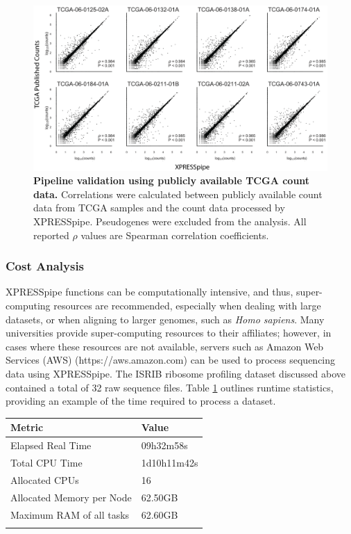 \documentclass[10pt, oneside]{article}
\begin{document}
\begin{figure}
\centering
  \includegraphics[width=180mm]{figures/xpresspipe_figure4.png}
  \caption{\textbf{Pipeline validation using publicly available TCGA count data.} Correlations were calculated between publicly available count data from TCGA samples and the count data processed by XPRESSpipe. Pseudogenes were excluded from the analysis. All reported $\rho$ values are Spearman correlation coefficients.}
  \label{fig:figure4}
\end{figure}


\subsubsection{Cost Analysis}
XPRESSpipe functions can be computationally intensive, and thus, super-computing resources are recommended, especially when dealing with large datasets, or when aligning to larger genomes, such as \textit{Homo sapiens}. Many universities provide super-computing resources to their affiliates; however, in cases where these resources are not available, servers such as Amazon Web Services (AWS) (https://aws.amazon.com) can be used to process sequencing data using XPRESSpipe. The ISRIB ribosome profiling dataset discussed above contained a total of 32 raw sequence files. Table \ref{tab:chpc_performance} outlines runtime statistics, providing an example of the time required to process a dataset. \par

\begin{table}[!]
    \centering
{}
\begin{tabular}{p{5cm}p{3cm}}
\textbf{Metric} & \textbf{Value} \\
\hline
 Elapsed Real Time & 09h32m58s \\
 \hline
 Total CPU Time & 1d10h11m42s \\
 \hline
 Allocated CPUs & 16 \\
 \hline
 Allocated Memory per Node & 62.50GB \\
 \hline
 Maximum RAM of all tasks & 62.60GB \\
 \label{tab:chpc_performance}
\end{tabular}
\end{table}
\end{document}
